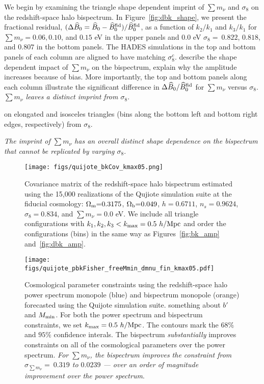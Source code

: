 \documentclass[12pt, letterpaper, preprint]{aastex62}
\newcommand{\Om}{\Omega_{\rm m}}
\newcommand{\Ob}{\Omega_{\rm b}}
\newcommand{\smnu}{\sum m_\nu}
\newcommand{\sig}{\sigma_8}
\newcommand{\BOk}{\widehat{B}_0}
\newcommand{\ch}[1]{{\color{orange}{\bf CH:} #1}}
\begin{document}
We begin by examining the triangle shape dependent imprint of $\smnu$ and 
$\sig$ on the redshift-space halo bispectrum. In Figure~\ref{fig:dbk_shape}, 
we present the fractional residual, $(\Delta \BOk = \BOk - \BOk^{\rm fid})/\BOk^{\rm fid}$,
as a function of $k_2/k_1$ and $k_3/k_1$ for $\smnu=0.06, 0.10$, and $0.15$ eV 
in the upper panels and 0.0 eV $\sig{=}~0.822$, $0.818$, and $0.807$ in the bottom panels. The HADES
simulations in the top and bottom panels of each column are aligned to 
have matching $\sig^{c}$. \ch{describe the shape dependent impact of 
$\smnu$ on the bispectrum, explain why the amplitude increases because of bias}. 
More importantly, the top and bottom panels along each column illustrate the 
significant difference in $\Delta \BOk/\BOk^{\rm fid}$ for $\smnu$ versus $\sig$. 
\emph{$\smnu$ leaves a distinct imprint from $\sig$}. 

on elongated and isosceles triangles (bins along the 
bottom left and bottom right edges, respectively) from $\sig$. 



{\em The imprint of $\smnu$ has an overall 
distinct shape dependence on the bispectrum that cannot be replicated by 
varying $\sig$}. 



\begin{figure}
\begin{center}
    \texttt{[image: figs/quijote\_bkCov\_kmax05.png]} 
    \caption{Covariance matrix of the redshift-space halo bispectrum estimated 
    using the 15,000 realizations of the Qujiote simulation suite at the fiducial 
    cosmology: $\Om{=}0.3175$, $\Ob{=}0.049$, $h{=}0.6711$, $n_s{=}0.9624$, $\sig{=}0.834$, 
    and $\smnu{=}0.0$ eV. We include all triangle configurations with $k_1, k_2, k_3 < k_{\rm max} = 0.5~h/{\rm Mpc}$
    and order the configurations (bins) in the same way as  Figures~\ref{fig:bk_amp} 
    and~\ref{fig:dbk_amp}.
    }
\label{fig:bk_cov}
\end{center}
\end{figure}

\begin{figure}
\begin{center}
    \texttt{[image: figs/quijote\_pbkFisher\_freeMmin\_dmnu\_fin\_kmax05.pdf]}
    \caption{Cosmological parameter constraints using the redshift-space halo power spectrum 
    monopole (blue) and bispectrum monopole (orange) forecasted using the Quijote simulation 
    suite. \ch{something about $b'$ and $M_{\rm min}$}.
    For both the power spectrum and bispectrum constraints, we set $k_{\rm max} = 0.5~h/{\rm Mpc}$. The 
    contours mark the $68\%$ and $95\%$ confidence interals. The bispectrum 
    {\em substantially} improves constraints on all of the cosmological parameters 
    over the power spectrum. {\em For $\smnu$, the bispectrum improves the constraint
    from $\sigma_{\smnu}{=}~0.319$ to $0.0239$ --- over an order of magnitude 
    improvement over the power spectrum}.}
\label{fig:bk_fish}
\end{center}
\end{figure}
\end{document}
